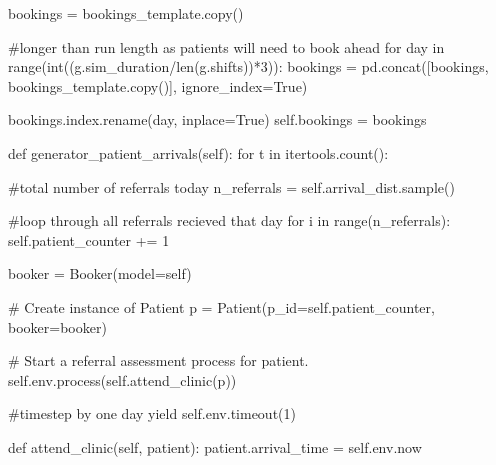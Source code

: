 \documentclass[
  letterpaper,
  DIV=11,
  numbers=noendperiod]{scrreprt}
\newenvironment{Shaded}{\begin{snugshade}}{\end{snugshade}}
\newcommand{\BuiltInTok}[1]{\textcolor[rgb]{0.00,0.23,0.31}{#1}}
\newcommand{\CommentTok}[1]{\textcolor[rgb]{0.37,0.37,0.37}{#1}}
\newcommand{\ControlFlowTok}[1]{\textcolor[rgb]{0.00,0.23,0.31}{#1}}
\newcommand{\DecValTok}[1]{\textcolor[rgb]{0.68,0.00,0.00}{#1}}
\newcommand{\KeywordTok}[1]{\textcolor[rgb]{0.00,0.23,0.31}{#1}}
\newcommand{\NormalTok}[1]{\textcolor[rgb]{0.00,0.23,0.31}{#1}}
\newcommand{\OperatorTok}[1]{\textcolor[rgb]{0.37,0.37,0.37}{#1}}
\newcommand{\StringTok}[1]{\textcolor[rgb]{0.13,0.47,0.30}{#1}}
\newcommand{\VariableTok}[1]{\textcolor[rgb]{0.07,0.07,0.07}{#1}}
\begin{document}
\begin{Shaded}
\begin{Highlighting}[]
\NormalTok{        bookings }\OperatorTok{=}\NormalTok{ bookings\_template.copy()}

        \CommentTok{\#longer than run length as patients will need to book ahead}
        \ControlFlowTok{for}\NormalTok{ day }\KeywordTok{in} \BuiltInTok{range}\NormalTok{(}\BuiltInTok{int}\NormalTok{((g.sim\_duration}\OperatorTok{/}\BuiltInTok{len}\NormalTok{(g.shifts))}\OperatorTok{*}\DecValTok{3}\NormalTok{)):}
\NormalTok{            bookings }\OperatorTok{=}\NormalTok{ pd.concat([bookings, bookings\_template.copy()],}
\NormalTok{                                 ignore\_index}\OperatorTok{=}\VariableTok{True}\NormalTok{)}

\NormalTok{        bookings.index.rename(}\StringTok{\textquotesingle{}day\textquotesingle{}}\NormalTok{, inplace}\OperatorTok{=}\VariableTok{True}\NormalTok{)}
        \VariableTok{self}\NormalTok{.bookings }\OperatorTok{=}\NormalTok{ bookings}

    \KeywordTok{def}\NormalTok{ generator\_patient\_arrivals(}\VariableTok{self}\NormalTok{):}
        \ControlFlowTok{for}\NormalTok{ t }\KeywordTok{in}\NormalTok{ itertools.count():}

            \CommentTok{\#total number of referrals today}
\NormalTok{            n\_referrals }\OperatorTok{=} \VariableTok{self}\NormalTok{.arrival\_dist.sample()}

            \CommentTok{\#loop through all referrals recieved that day}
            \ControlFlowTok{for}\NormalTok{ i }\KeywordTok{in} \BuiltInTok{range}\NormalTok{(n\_referrals):}
                \VariableTok{self}\NormalTok{.patient\_counter }\OperatorTok{+=} \DecValTok{1}

\NormalTok{                booker }\OperatorTok{=}\NormalTok{ Booker(model}\OperatorTok{=}\VariableTok{self}\NormalTok{)}

                \CommentTok{\# Create instance of Patient}
\NormalTok{                p }\OperatorTok{=}\NormalTok{ Patient(p\_id}\OperatorTok{=}\VariableTok{self}\NormalTok{.patient\_counter, booker}\OperatorTok{=}\NormalTok{booker)}

                \CommentTok{\# Start a referral assessment process for patient.}
                \VariableTok{self}\NormalTok{.env.process(}\VariableTok{self}\NormalTok{.attend\_clinic(p))}

            \CommentTok{\#timestep by one day}
            \ControlFlowTok{yield} \VariableTok{self}\NormalTok{.env.timeout(}\DecValTok{1}\NormalTok{)}

    \KeywordTok{def}\NormalTok{ attend\_clinic(}\VariableTok{self}\NormalTok{, patient):}
\NormalTok{        patient.arrival\_time }\OperatorTok{=} \VariableTok{self}\NormalTok{.env.now}


\end{Highlighting}
\end{Shaded}
\end{document}
